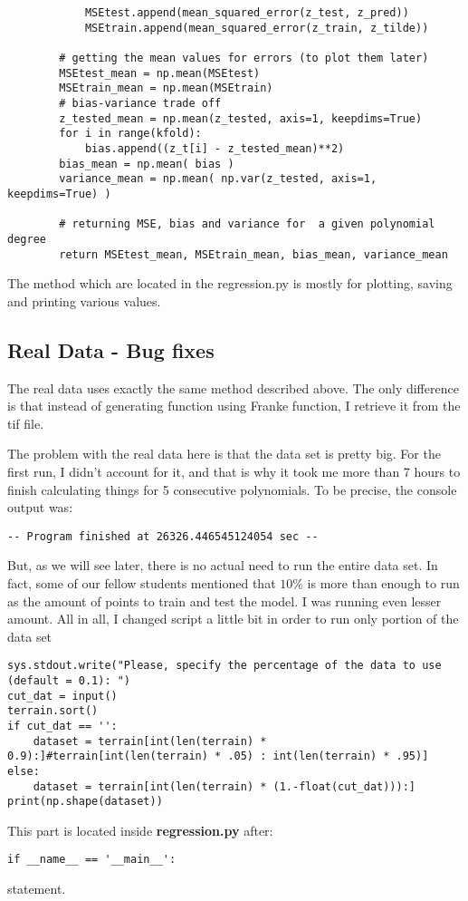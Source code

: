\begin{lstlisting}
            MSEtest.append(mean_squared_error(z_test, z_pred))
            MSEtrain.append(mean_squared_error(z_train, z_tilde))

        # getting the mean values for errors (to plot them later)
        MSEtest_mean = np.mean(MSEtest)
        MSEtrain_mean = np.mean(MSEtrain)
        # bias-variance trade off
        z_tested_mean = np.mean(z_tested, axis=1, keepdims=True)
        for i in range(kfold):
            bias.append((z_t[i] - z_tested_mean)**2)
        bias_mean = np.mean( bias )
        variance_mean = np.mean( np.var(z_tested, axis=1, keepdims=True) )

        # returning MSE, bias and variance for  a given polynomial degree
        return MSEtest_mean, MSEtrain_mean, bias_mean, variance_mean
\end{lstlisting}

The method which are located in the regression.py is mostly for plotting, saving and printing various values.

\subsection{Real Data - Bug fixes}

The real data uses exactly the same method described above. The only difference is that instead of generating function using Franke function, I retrieve it from the tif file. 

The problem with the real data here is that the data set is pretty big. For the first run, I didn't account for it, and that is why it took me more than 7 hours to finish calculating things for 5 consecutive polynomials. To be precise, the console output was:
\begin{lstlisting}
-- Program finished at 26326.446545124054 sec --
\end{lstlisting}
But, as we will see later, there is no actual need to run the entire data set. In fact, some of our fellow students mentioned that $10\%$ is more than enough to run as the amount of points to train and test the model. I was running even lesser amount. All in all, I changed script a little bit in order to run only portion of the data set
\begin{lstlisting}
sys.stdout.write("Please, specify the percentage of the data to use (default = 0.1): ")
cut_dat = input()
terrain.sort()
if cut_dat == '':
    dataset = terrain[int(len(terrain) * 0.9):]#terrain[int(len(terrain) * .05) : int(len(terrain) * .95)]
else:
    dataset = terrain[int(len(terrain) * (1.-float(cut_dat))):]
print(np.shape(dataset))
\end{lstlisting}
This part is located inside \textbf{regression.py} after:
\begin{lstlisting}
if __name__ == '__main__':
\end{lstlisting}
statement.

